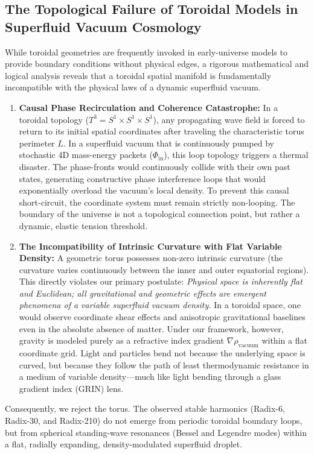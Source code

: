 \documentclass[11pt,a4paper]{article}
\theoremstyle{plain}
\theoremstyle{definition}
\theoremstyle{remark}
\begin{document}
\subsection{The Topological Failure of Toroidal Models in Superfluid Vacuum Cosmology}
While toroidal geometries are frequently invoked in early-universe models to provide boundary conditions without physical edges, a rigorous mathematical and logical analysis reveals that a toroidal spatial manifold is fundamentally incompatible with the physical laws of a dynamic superfluid vacuum.
\begin{enumerate}
    \item \textbf{Causal Phase Recirculation and Coherence Catastrophe:} In a toroidal topology ($T^3 = S^1 \times S^1 \times S^1$), any propagating wave field is forced to return to its initial spatial coordinates after traveling the characteristic torus perimeter $L$. In a superfluid vacuum that is continuously pumped by stochastic 4D mass-energy packets ($\Phi_{\text{in}}$), this loop topology triggers a thermal disaster. The phase-fronts would continuously collide with their own past states, generating constructive phase interference loops that would exponentially overload the vacuum's local density. To prevent this causal short-circuit, the coordinate system must remain strictly non-looping. The boundary of the universe is not a topological connection point, but rather a dynamic, elastic tension threshold.
    \item \textbf{The Incompatibility of Intrinsic Curvature with Flat Variable Density:} A geometric torus possesses non-zero intrinsic curvature (the curvature varies continuously between the inner and outer equatorial regions). This directly violates our primary postulate: \textit{Physical space is inherently flat and Euclidean; all gravitational and geometric effects are emergent phenomena of a variable superfluid vacuum density.} In a toroidal space, one would observe coordinate shear effects and anisotropic gravitational baselines even in the absolute absence of matter. Under our framework, however, gravity is modeled purely as a refractive index gradient $\nabla \rho_{\text{vacuum}}$ within a flat coordinate grid. Light and particles bend not because the underlying space is curved, but because they follow the path of least thermodynamic resistance in a medium of variable density—much like light bending through a glass gradient index (GRIN) lens.
\end{enumerate}
Consequently, we reject the torus. The observed stable harmonics (Radix-6, Radix-30, and Radix-210) do not emerge from periodic toroidal boundary loops, but from spherical standing-wave resonances (Bessel and Legendre modes) within a flat, radially expanding, density-modulated superfluid droplet.
\end{document}
